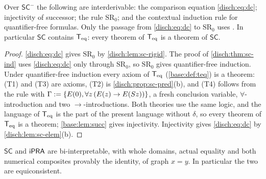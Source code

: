 \begin{proposition}
\label{disch:prop:sc-equiv}
Over $\mathsf{SC}^{-}$ the following are interderivable: the comparison
equation \eqref{disch:eq:dc}; injectivity of successor; the rule
$\mathrm{SR}_0$; and the contextual induction rule for quantifier-free
formulas. Only the passage from \eqref{disch:eq:dc} to $\mathrm{SR}_0$ uses
. In particular $\mathsf{SC}$ contains $\mathsf{T}_{\mathrm{eq}}$: every theorem
of $\mathsf{T}_{\mathrm{eq}}$ is a theorem of $\mathsf{SC}$.
\end{proposition}

\begin{proof}
\eqref{disch:eq:dc} gives $\mathrm{SR}_0$ by \cref{disch:lem:sc-rigid}. The
proof of \cref{disch:thm:sc-ind} uses \eqref{disch:eq:dc} only through
$\mathrm{SR}_0$, so $\mathrm{SR}_0$ gives quantifier-free induction. Under
quantifier-free induction every axiom of $\mathsf{T}_{\mathrm{eq}}$ (\cref{base:def:teq}) is a
theorem: (T1) and (T3) are axioms, (T2) is
\cref{disch:prop:sc-pred}(b), and (T4) follows from the rule with
$\Gamma\mathrel{:=}\{E(0),\forall z\,(E(z)\to E(S z))\}$, a fresh conclusion
variable, $\forall$-introduction and two $\to$-introductions. Both theories
use the same logic, and the language of $\mathsf{T}_{\mathrm{eq}}$ is the part of the present
language without $\delta$, so every theorem of $\mathsf{T}_{\mathrm{eq}}$ is a theorem;
\cref{base:lem:succ} gives injectivity. Injectivity gives
\eqref{disch:eq:dc} by \cref{disch:lem:sc-elem}(b).
\end{proof}

\begin{theorem}
\label{disch:thm:sc-ipra}
$\mathsf{SC}$ and $\mathsf{iPRA}$ are bi-interpretable, with whole domains, actual
equality and both numerical composites provably the identity, of graph
$x=y$. In particular the two are equiconsistent.
\end{theorem}

